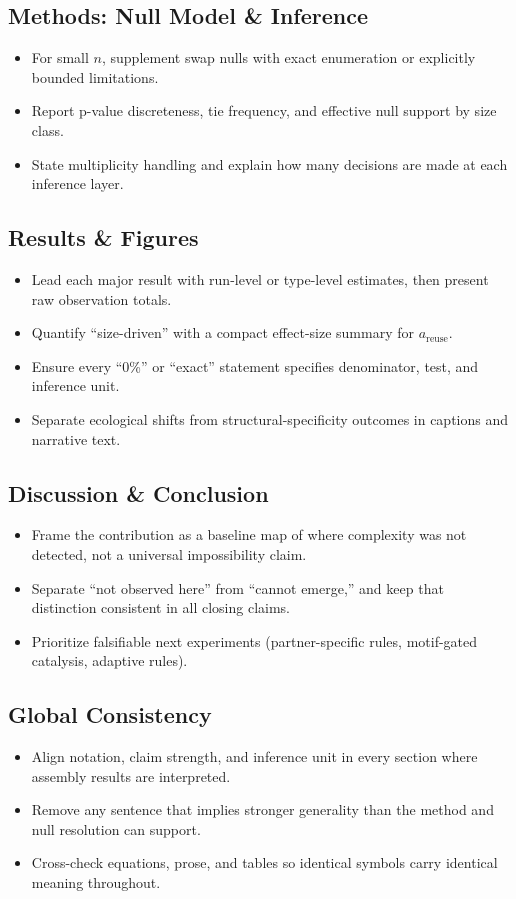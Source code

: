\documentclass[11pt]{article}
\begin{document}
\subsection*{Methods: Null Model \& Inference}
\begin{itemize}
\item For small $n$, supplement swap nulls with exact enumeration or explicitly bounded limitations.
\item Report p-value discreteness, tie frequency, and effective null support by size class.
\item State multiplicity handling and explain how many decisions are made at each inference layer.
\end{itemize}

\subsection*{Results \& Figures}
\begin{itemize}
\item Lead each major result with run-level or type-level estimates, then present raw observation totals.
\item Quantify ``size-driven'' with a compact effect-size summary for $a_{\text{reuse}}$.
\item Ensure every ``0\%'' or ``exact'' statement specifies denominator, test, and inference unit.
\item Separate ecological shifts from structural-specificity outcomes in captions and narrative text.
\end{itemize}

\subsection*{Discussion \& Conclusion}
\begin{itemize}
\item Frame the contribution as a baseline map of where complexity was not detected, not a universal impossibility claim.
\item Separate ``not observed here'' from ``cannot emerge,'' and keep that distinction consistent in all closing claims.
\item Prioritize falsifiable next experiments (partner-specific rules, motif-gated catalysis, adaptive rules).
\end{itemize}

\subsection*{Global Consistency}
\begin{itemize}
\item Align notation, claim strength, and inference unit in every section where assembly results are interpreted.
\item Remove any sentence that implies stronger generality than the method and null resolution can support.
\item Cross-check equations, prose, and tables so identical symbols carry identical meaning throughout.
\end{itemize}
\end{document}
